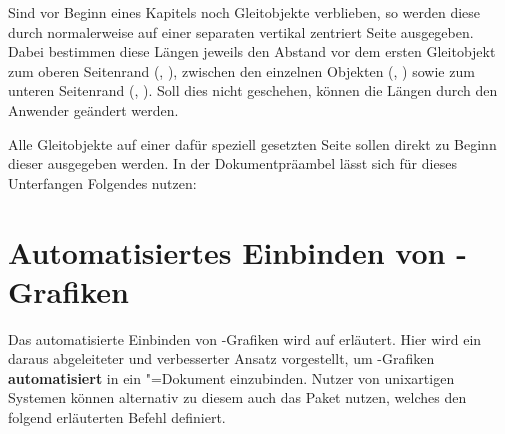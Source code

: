 \begin{Declaration}{}
\begin{Declaration}{}
\begin{Declaration}{}
\begin{Declaration}{}
\begin{Declaration}{}
\begin{Declaration}{}
\printdeclarationlist%
%
Sind vor Beginn eines Kapitels noch Gleitobjekte verblieben, so werden diese 
durch  normalerweise auf einer separaten vertikal zentriert Seite 
ausgegeben. Dabei bestimmen diese Längen jeweils den Abstand vor dem ersten 
Gleitobjekt zum oberen Seitenrand (, ), 
zwischen den einzelnen Objekten (, ) sowie 
zum unteren Seitenrand (, ). Soll dies nicht 
geschehen, können die Längen durch den Anwender geändert werden.
\end{Declaration}
\end{Declaration}
\end{Declaration}
\end{Declaration}
\end{Declaration}
\end{Declaration}
%
\begin{Example}
Alle Gleitobjekte auf einer dafür speziell gesetzten Seite sollen direkt zu 
Beginn dieser ausgegeben werden. In der Dokumentpräambel lässt sich für dieses 
Unterfangen Folgendes nutzen:
\begin{Code}
\makeatletter
\setlength{\@fptop}{0pt}
\setlength{\@dblfptop}{0pt}%
\makeatother
\end{Code}
\end{Example}



\section{Automatisiertes Einbinden von -Grafiken }
%
%
%
Das automatisierte Einbinden von -Grafiken wird auf 
 erläutert. Hier wird ein 
daraus abgeleiteter und verbesserter Ansatz vorgestellt, um 
-Grafiken \textbf{automatisiert} in ein 
"=Dokument einzubinden. Nutzer von unixartigen Systemen können 
alternativ zu diesem auch das Paket  nutzen, welches den folgend 
erläuterten Befehl  definiert.


